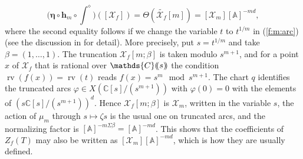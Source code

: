 \documentclass[12pt]{amsart}
\theoremstyle{plain}
\theoremstyle{definition}
\theoremstyle{remark}
\numberwithin{equation}{section}
\theoremstyle{plain}
\newcommand{\A}{\mathds{A}}
\newcommand{\C}{\mathds{C}}
\newcommand{\0}{\emptyset}
\newcommand{\dpar}[1]{%
   (\mkern-4mu (#1 )\mkern-4mu )}
\newcommand{\mdl}[1]{\mathcal{#1}}  %
\newcommand{\efun}{\longmapsto}
\DeclareMathOperator{\rv}{rv}
\begin{document}
\begin{equation}\label{z:coeff:change}
 \Big(\bm \eta \circ \bm h_m \circ \int^{\diamond} \Big)([\mdl X_f]) = \Theta(\tilde{\mdl X_f}[m]) = [\mdl X_{m}][\A]^{-md},
\end{equation}
where the second equality follows if  we change the variable $t$ to $t^{1/m}$ in (\ref{f:m:arc}) (see the discussion in \cite[\S~6.2]{hru:loe:lef} for  detail). More precisely, put $s = t^{1/m}$ and take $\beta = (1, \ldots, 1)$. The truncation $\mdl X_f[m;\beta]$ is taken modulo $s^{m+1}$, and for a point $x$ of $\mdl X_f$ that is rational over $\C \dpar{s}$ the condition $\rv(f(x)) = \rv(t)$ reads $f(x) = s^m \mod s^{m+1}$. The chart $q$ identifies the truncated arcs $\varphi \in X(\C[s]/(s^{m+1}))$ with $\varphi(0) = 0$ with the elements of $(s\C[s]/(s^{m+1}))^d$. Hence $\mdl X_f[m;\beta]$ is $\mdl X_m$, written in the variable $s$, the action of $\mu_m$ through $s \efun \zeta s$ is the usual one on truncated arcs, and the normalizing factor is $[\A]^{-m \Sigma \beta} = [\A]^{-md}$. This shows that the coefficients of $Z_f(T)$ may also be written as $[\mdl X_{m}][\A]^{-md}$, which is how they are usually defined.
\end{document}
